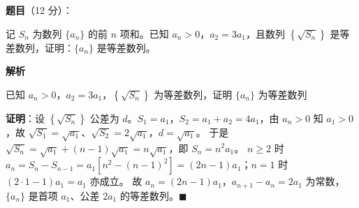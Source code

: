 \begin{answer}

\textbf{题目}（12 分）：

记 $S_n$ 为数列 $\{a_n\}$ 的前 $n$ 项和。已知 $a_n>0$，$a_2=3a_1$，且数列 $\left\{\sqrt{S_n}\right\}$ 是等差数列，证明：$\{a_n\}$ 是等差数列。

\textbf{解析}

已知 $a_n>0$，$a_2=3a_1$，$\left\{\sqrt{S_n}\right\}$ 为等差数列，证明 $\{a_n\}$ 为等差数列

\begin{gktip}
\textbf{证明}：设 $\left\{\sqrt{S_n}\right\}$ 公差为 $d$。$S_1=a_1$，$S_2=a_1+a_2=4a_1$，由 $a_n>0$ 知 $a_1>0$，故 $\sqrt{S_1}=\sqrt{a_1}$、$\sqrt{S_2}=2\sqrt{a_1}$，$d=\sqrt{a_1}$。
于是 $\sqrt{S_n}=\sqrt{a_1}+(n-1)\sqrt{a_1}=n\sqrt{a_1}$，即 $S_n=n^2a_1$。
$n\geqslant2$ 时 $a_n=S_n-S_{n-1}=a_1\left[n^2-(n-1)^2\right]=(2n-1)a_1$；$n=1$ 时 $(2\cdot1-1)a_1=a_1$ 亦成立。
故 $a_n=(2n-1)a_1$，$a_{n+1}-a_n=2a_1$ 为常数，$\{a_n\}$ 是首项 $a_1$、公差 $2a_1$ 的等差数列。$\blacksquare$
\end{gktip}


\end{answer}

